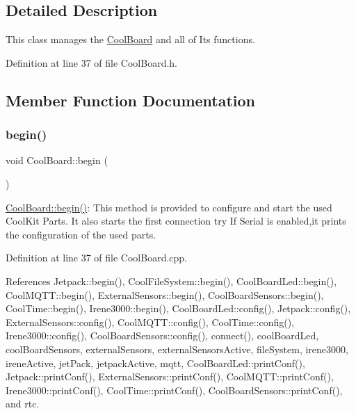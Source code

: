 \subsection{Detailed Description}
This class manages the \hyperlink{classCoolBoard}{Cool\+Board} and all of Its functions. 

Definition at line 37 of file Cool\+Board.\+h.



\subsection{Member Function Documentation}
\mbox{\label{classCoolBoard_acba7c5aef7268b2c0044bdb54d3b9d76}} 
\subsubsection{\texorpdfstring{begin()}{begin()}}
{\footnotesize\ttfamily void Cool\+Board\+::begin (\begin{DoxyParamCaption}{ }\end{DoxyParamCaption})}

\hyperlink{classCoolBoard_acba7c5aef7268b2c0044bdb54d3b9d76}{Cool\+Board\+::begin()}\+: This method is provided to configure and start the used Cool\+Kit Parts. It also starts the first connection try If Serial is enabled,it prints the configuration of the used parts. 

Definition at line 37 of file Cool\+Board.\+cpp.



References Jetpack\+::begin(), Cool\+File\+System\+::begin(), Cool\+Board\+Led\+::begin(), Cool\+M\+Q\+T\+T\+::begin(), External\+Sensors\+::begin(), Cool\+Board\+Sensors\+::begin(), Cool\+Time\+::begin(), Irene3000\+::begin(), Cool\+Board\+Led\+::config(), Jetpack\+::config(), External\+Sensors\+::config(), Cool\+M\+Q\+T\+T\+::config(), Cool\+Time\+::config(), Irene3000\+::config(), Cool\+Board\+Sensors\+::config(), connect(), cool\+Board\+Led, cool\+Board\+Sensors, external\+Sensors, external\+Sensors\+Active, file\+System, irene3000, irene\+Active, jet\+Pack, jetpack\+Active, mqtt, Cool\+Board\+Led\+::print\+Conf(), Jetpack\+::print\+Conf(), External\+Sensors\+::print\+Conf(), Cool\+M\+Q\+T\+T\+::print\+Conf(), Irene3000\+::print\+Conf(), Cool\+Time\+::print\+Conf(), Cool\+Board\+Sensors\+::print\+Conf(), and rtc.


